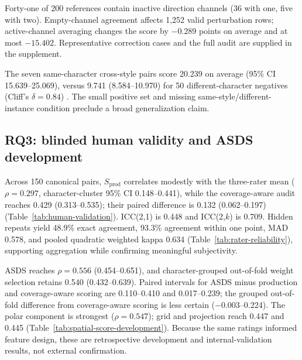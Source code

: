 Forty-one of 200 references contain inactive direction channels (36 with one,
five with two). Empty-channel agreement affects 1,252 valid perturbation
rows; active-channel averaging changes the score by \(-0.289\) points on
average and at most \(-15.402\). Representative correction cases and the full
audit are supplied in the supplement.



The seven same-character cross-style pairs score 20.239 on average
(95\% CI 15.639--25.069), versus 9.741 (8.584--10.970) for 50
different-character negatives (Cliff's \(\delta=0.84\))
\cite{cliff1993dominance}. The small positive set and missing
same-style/different-instance condition preclude a broad generalization claim.

\subsection{RQ3: blinded human validity and ASDS development}




Across 150 canonical pairs, \(S_{\mathrm{prod}}\) correlates modestly with
the three-rater mean (\(\rho=0.297\), character-cluster 95\% CI
0.148--0.441), while the coverage-aware audit reaches 0.429
(0.313--0.535); their paired difference is 0.132 (0.062--0.197)
(Table~\ref{tab:human-validation}). ICC(2,1) is 0.448 and ICC(2,\(k\))
is 0.709. Hidden repeats yield 48.9\% exact agreement, 93.3\% agreement
within one point, MAD 0.578, and pooled quadratic weighted kappa 0.634
(Table~\ref{tab:rater-reliability}), supporting aggregation while confirming
meaningful subjectivity.



ASDS reaches \(\rho=0.556\) (0.454--0.651), and character-grouped
out-of-fold weight selection retains 0.540 (0.432--0.639). Paired intervals
for ASDS minus production and coverage-aware scoring are 0.110--0.410 and
0.017--0.239; the grouped out-of-fold difference from coverage-aware scoring
is less certain (\(-0.003\)--0.224). The polar component is strongest
(\(\rho=0.547\)); grid and projection reach 0.447 and 0.445
(Table~\ref{tab:spatial-score-development}). Because the same ratings informed
feature design, these are retrospective development and internal-validation
results, not external confirmation.



